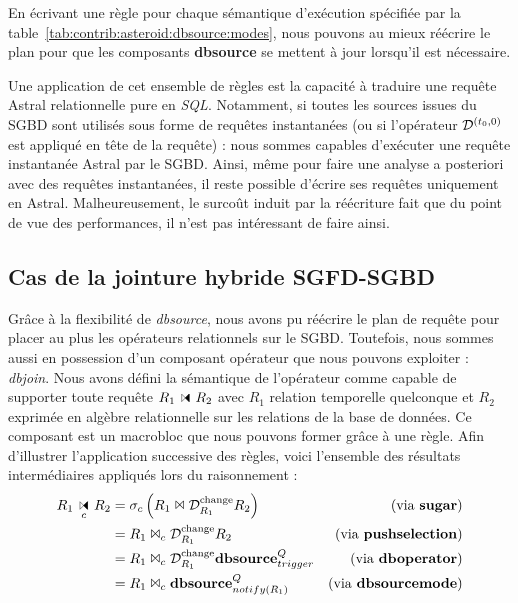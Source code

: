 En écrivant une règle pour chaque sémantique d'exécution spécifiée par la table~\ref{tab:contrib:asteroid:dbsource:modes}, nous pouvons au mieux réécrire le plan pour que les composants \textbf{dbsource} se mettent à jour lorsqu'il est nécessaire.

Une application de cet ensemble de règles est la capacité à traduire une requête Astral relationnelle pure en \textit{SQL}. Notamment, si toutes les sources issues du SGBD sont utilisés sous forme de requêtes instantanées (ou si l'opérateur $\mathcal{D}^{(t_0,0)}$ est appliqué en tête de la requête) : nous sommes capables d'exécuter une requête instantanée Astral par le SGBD. Ainsi, même pour faire une analyse a posteriori avec des requêtes instantanées, il reste possible d'écrire ses requêtes uniquement en Astral. Malheureusement, le surcoût induit par la réécriture fait que du point de vue des performances, il n'est pas intéressant de faire ainsi.

\subsection{Cas de la jointure hybride SGFD-SGBD}\label{sec:contrib:asteroid:reecriture:join}
Grâce à la flexibilité de \textit{dbsource}, nous avons pu réécrire le plan de requête pour placer au plus les opérateurs relationnels sur le SGBD. Toutefois, nous sommes aussi en possession d'un composant opérateur que nous pouvons exploiter : \textit{dbjoin}. Nous avons défini la sémantique de l'opérateur comme capable de supporter toute requête $R_1\ssjoin R_2$ avec $R_1$ relation temporelle quelconque et $R_2$ exprimée en algèbre relationnelle sur les relations de la base de données. Ce composant est un macrobloc que nous pouvons former grâce à une règle. Afin d'illustrer l'application successive des règles, voici l'ensemble des résultats intermédiaires appliqués lors du raisonnement :
\begin{align*} 
R_1\ssjoin_c R_2 &= \sigma_c \left(R_1 \Join \D^{\mathrm{change}}_{R_1} R_2\right) & \text{(via \textbf{sugar})}\\
& =  R_1 \Join_c \D^{\mathrm{change}}_{R_1} R_2 & \text{(via \textbf{pushselection})}\\
& =  R_1 \Join_c \D^{\mathrm{change}}_{R_1} \textbf{dbsource}_{trigger}^{Q} & \text{(via \textbf{dboperator})}\\
& =  R_1 \Join_c \textbf{dbsource}_{notify(R_1)}^{Q} & \text{(via \textbf{dbsourcemode})}
\end{align*}

